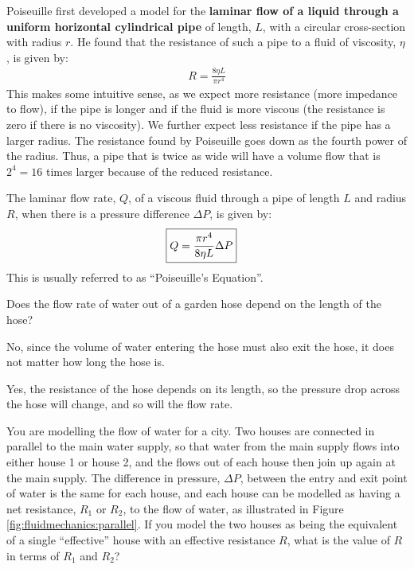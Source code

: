 {{Poiseuille first developed a model for the \textbf{laminar flow of a liquid through a uniform horizontal cylindrical pipe} of length, $L$, with a circular cross-section with radius $r$. He found that the resistance of such a pipe to a fluid of viscosity, $\eta $, is given by:
\begin{align*}
R = \frac{8\eta L}{\pi r^4}
\end{align*}
This makes some intuitive sense, as we expect more resistance (more impedance to flow), if the pipe is longer and if the fluid is more viscous (the resistance is zero if there is no viscosity). We further expect less resistance if the pipe has a larger radius. The resistance found by Poiseuille goes down as the fourth power of the radius. Thus, a pipe that is twice as wide will have a volume flow that is $2^4=16$ times larger because of the reduced resistance. 

The laminar flow rate, $Q$, of a viscous fluid through a pipe of length $L$ and radius $R$, when there is a pressure difference $\Delta P$, is given by:
\begin{align}
\Aboxed{Q =  \frac{\pi r^4}{8\eta L}\Delta P}
\end{align}
This is usually referred to as ``Poiseuille's Equation''.

\begin{checkpoint}
\begin{MCquestion}{Does the flow rate of water out of a garden hose depend on the length of the hose?}
\item No, since the volume of water entering the hose must also exit the hose, it does not matter how long the hose is. 
\item Yes, the resistance of the hose depends on its length, so the pressure drop across the hose will change, and so will the flow rate. \correct
\end{MCquestion}
\end{checkpoint}

\begin{example}{You are modelling the flow of water for a city. Two houses are connected in parallel to the main water supply, so that water from the main supply flows into either house 1 or house 2, and the flows out of each house then join up again at the main supply. The difference in pressure, $\Delta P$, between the entry and exit point of water is the same for each house, and each house can be modelled as having a net resistance, $R_{1}$ or $R_2$, to the flow of water, as illustrated in Figure \ref{fig:fluidmechanics:parallel}. If you model the two houses as being the equivalent of a single ``effective'' house with an effective resistance $R$, what is the value of $R$ in terms of $R_1$ and $R_2$?
}


\end{example}}}
